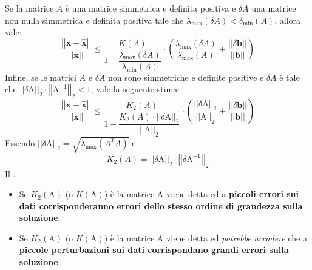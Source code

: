 \noindent
Se la matrice $A$ è una matrice simmetrica e definita positiva e $\delta A$ una matrice non nulla simmetrica e definita positiva tale che $\lambda_{\text{max}}\left(\delta A\right) < \delta_{\text{min}}\left(A\right)$, allora vale:
\begin{equation}
    \dfrac{
        \left|\left| \mathbf{x} - \widehat{\mathbf{x}} \right|\right|
    }{
        \left|\left| \mathbf{x} \right|\right|
    }
    \le
    \dfrac{
        K\left(A\right)
    }{
        1 - \dfrac{\lambda_{\text{max}}\left(\delta A\right)}{\lambda_{\text{min}}\left(A\right)}
    }
    \cdot
    \left(
        \dfrac{\lambda_{\text{max}}\left(\delta A\right)}{\lambda_{\text{max}}\left(A\right)} + \dfrac{\left|\left| \delta \mathbf{b} \right|\right|}{\left|\left|\mathbf{b}\right|\right|}
    \right)
\end{equation}
Infine, se le matrici $A$ e $\delta A$ non sono simmetriche e definite positive e $\delta A$ è tale che $\left|\left| \delta \mathrm{A} \right|\right|_{2} \cdot \left|\left| \mathrm{A}^{-1} \right|\right|_{2} < 1$, vale la seguente stima:
\begin{equation}
    \dfrac{
        \left|\left| \mathbf{x} - \widehat{\mathbf{x}} \right|\right|
    }{
        \left|\left| \mathbf{x} \right|\right|
    }
    \le
    \dfrac{
        K_{2}\left(A\right)
    }{
        1 - \dfrac{K_{2}\left(A\right) \cdot \left|\left| \delta \mathrm{A} \right|\right|_{2}}{\left|\left| \mathrm{A} \right|\right|_{2}}
    }
    \cdot
    \left(
        \dfrac{\left|\left| \delta \mathrm{A} \right|\right|_{2}}{\left|\left| \mathrm{A} \right|\right|_{2}} + \dfrac{\left|\left| \delta \mathbf{b} \right|\right|}{\left|\left|\mathbf{b}\right|\right|}
    \right)
\end{equation}
Essendo $\left|\left| \delta \mathrm{A} \right|\right|_{2} = \sqrt{\lambda_{\text{max}} \left(A^{T} A\right)}$ e:
\begin{equation}
    K_{2}\left(A\right) = \left|\left| \delta \mathrm{A} \right|\right|_{2} \cdot \left|\left| \delta \mathrm{A}^{-1} \right|\right|_{2}
\end{equation}
Il .
\begin{itemize}
    \item Se $K_{2}\left(\mathrm{A}\right)$ (o $K\left(\mathrm{A}\right)$) è  la matrice A viene detta  ed a \textbf{piccoli errori sui dati corrisponderanno errori dello stesso ordine di grandezza sulla soluzione}.

    \item Se $K_{2}\left(\mathrm{A}\right)$ (o $K\left(\mathrm{A}\right)$) è  la matrice A viene detta  ed \emph{potrebbe accadere} che a \textbf{piccole perturbazioni sui dati corrispondano grandi errori sulla soluzione}.
\end{itemize}

